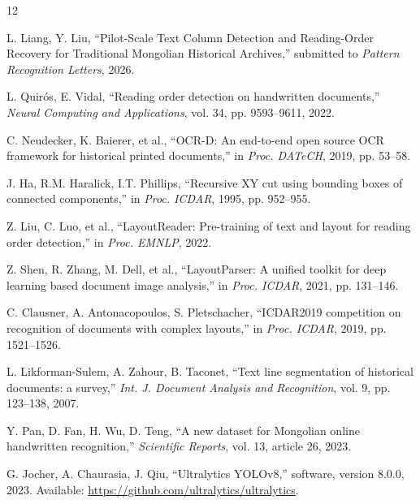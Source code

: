 \documentclass[5p,times,twocolumn]{elsarticle}
\begin{document}
\begin{thebibliography}{12}

L. Liang, Y. Liu, ``Pilot-Scale Text Column Detection and Reading-Order Recovery for Traditional Mongolian Historical Archives,'' submitted to \emph{Pattern Recognition Letters}, 2026.

L. Quir\'os, E. Vidal, ``Reading order detection on handwritten documents,'' \emph{Neural Computing and Applications}, vol. 34, pp. 9593--9611, 2022.

C. Neudecker, K. Baierer, et al., ``OCR-D: An end-to-end open source OCR framework for historical printed documents,'' in \emph{Proc. DATeCH}, 2019, pp. 53--58.

J. Ha, R.M. Haralick, I.T. Phillips, ``Recursive XY cut using bounding boxes of connected components,'' in \emph{Proc. ICDAR}, 1995, pp. 952--955.

Z. Liu, C. Luo, et al., ``LayoutReader: Pre-training of text and layout for reading order detection,'' in \emph{Proc. EMNLP}, 2022.

Z. Shen, R. Zhang, M. Dell, et al., ``LayoutParser: A unified toolkit for deep learning based document image analysis,'' in \emph{Proc. ICDAR}, 2021, pp. 131--146.

C. Clausner, A. Antonacopoulos, S. Pletschacher, ``ICDAR2019 competition on recognition of documents with complex layouts,'' in \emph{Proc. ICDAR}, 2019, pp. 1521--1526.

L. Likforman-Sulem, A. Zahour, B. Taconet, ``Text line segmentation of historical documents: a survey,'' \emph{Int. J. Document Analysis and Recognition}, vol. 9, pp. 123--138, 2007.

Y. Pan, D. Fan, H. Wu, D. Teng, ``A new dataset for Mongolian online handwritten recognition,'' \emph{Scientific Reports}, vol. 13, article 26, 2023.

G. Jocher, A. Chaurasia, J. Qiu, ``Ultralytics YOLOv8,'' software, version 8.0.0, 2023. Available: \url{https://github.com/ultralytics/ultralytics}.

\end{thebibliography}
\end{document}
